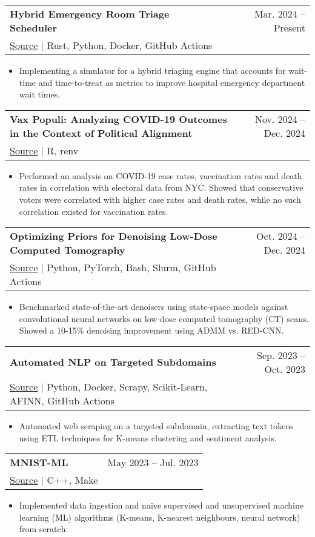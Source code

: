 \documentclass[letterpaper,11pt]{article}
\makeatletter
\newcommand{\resumeItem}[1]{
  \item\small{
    {#1 \vspace{-2pt}}
  }
}
\newcommand{\resumeProjectHeading}[4]{ %
    \item
    \begin{tabular*}{0.97\textwidth}{l@{\extracolsep{\fill}}r}
      \small\textbf{#1} & #2 \\
    \small\href{#3}{{\footnotesize\faGithub} \underline{Source}} $|$ #4 & \\ %
    \end{tabular*}\vspace{-7pt}
}
\newcommand{\resumeItemListStart}{\begin{itemize}}
\newcommand{\resumeItemListEnd}{\end{itemize}\vspace{-5pt}}
\makeatother
\begin{document}
        \resumeProjectHeading
          {Hybrid Emergency Room Triage Scheduler}
          {Mar. 2024 -- Present}
          {https://github.com/john-s-lin/desert} %
          {Rust, Python, Docker, GitHub Actions} %
          \resumeItemListStart
            \resumeItem{Implementing a simulator for a hybrid triaging engine that accounts for wait-time and time-to-treat as metrics to improve hospital emergency department wait times.}
          \resumeItemListEnd

        \resumeProjectHeading
          {Vax Populi: Analyzing COVID-19 Outcomes in the Context of Political Alignment}
          {Nov. 2024 -- Dec. 2024}
          {https://github.com/john-s-lin/vax-populi} %
          {R, renv} %
          \resumeItemListStart
            \resumeItem{Performed an analysis on COVID-19 case rates, vaccination rates and death rates in correlation with electoral data from NYC. Showed that conservative voters were correlated with higher case rates and death rates, while no such correlation existed for vaccination rates.}
          \resumeItemListEnd
          
        \resumeProjectHeading
          {Optimizing Priors for Denoising Low-Dose Computed Tomography}
          {Oct. 2024 -- Dec. 2024}
          {https://github.com/john-s-lin/mambagym} %
          {Python, PyTorch, Bash, Slurm, GitHub Actions} %
          \resumeItemListStart
            \resumeItem{Benchmarked state-of-the-art denoisers using state-space models against convolutional neural networks on low-dose computed tomography (CT) scans. Showed a 10-15\% denoising improvement using ADMM vs. RED-CNN.}
          \resumeItemListEnd

      \resumeProjectHeading
          {Automated NLP on Targeted Subdomains}
          {Sep. 2023 -- Oct. 2023}
          {https://github.com/john-s-lin/nonsense-sentiment-scraper} %
          {Python, Docker, Scrapy, Scikit-Learn, AFINN, GitHub Actions} %
          \resumeItemListStart
            \resumeItem{Automated web scraping on a targeted subdomain, extracting text tokens using ETL techniques for K-means clustering and sentiment analysis.}
          \resumeItemListEnd

      \resumeProjectHeading
          {MNIST-ML}
          {May 2023 -- Jul. 2023}
          {https://github.com/john-s-lin/mnist-ml} %
          {C++, Make} %
          \resumeItemListStart
            \resumeItem{Implemented data ingestion and naïve supervised and unsupervised machine learning (ML) algorithms (K-means, K-nearest neighbours, neural network) from scratch.}
          \resumeItemListEnd
\end{document}
